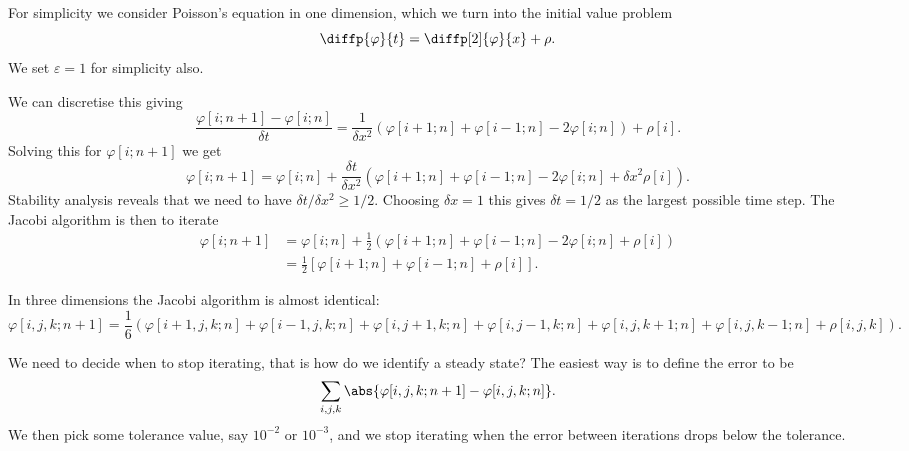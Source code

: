 \documentclass[fleqn]{NotesClass}
\begin{document}
    For simplicity we consider Poisson's equation in one dimension, which we turn into the initial value problem
    \begin{equation}
        \diffp{\varphi}{t} = \diffp[2]{\varphi}{x} + \rho.
    \end{equation}
    We set \(\varepsilon = 1\) for simplicity also.
    
    We can discretise this giving
    \begin{equation}
        \frac{\varphi[i; n + 1] - \varphi[i; n]}{\delta t} = \frac{1}{\delta x^2}(\varphi[i + 1; n] + \varphi[i - 1; n] - 2\varphi[i; n]) + \rho[i].
    \end{equation}
    Solving this for \(\varphi[i; n + 1]\) we get
    \begin{equation}
        \varphi[i; n + 1] = \varphi[i; n] + \frac{\delta t}{\delta x^2}(\varphi[i + 1; n] + \varphi[i - 1; n] - 2\varphi[i; n] + \delta x^2\rho[i]).
    \end{equation}
    Stability analysis reveals that we need to have \(\delta t/\delta x^2 \ge 1/2\).
    Choosing \(\delta x = 1\) this gives \(\delta t = 1/2\) as the largest possible time step.
    The Jacobi algorithm is then to iterate
    \begin{align}
        \varphi[i; n + 1] &= \varphi[i; n] + \frac{1}{2}(\varphi[i + 1; n] + \varphi[i - 1; n] - 2\varphi[i; n] + \rho[i])\\
        &= \frac{1}{2}[\varphi[i + 1; n] + \varphi[i - 1; n] + \rho[i]].
    \end{align}
    
    In three dimensions the Jacobi algorithm is almost identical:
    \begin{equation}
        \varphi[i, j, k; n + 1] = \frac{1}{6}(\varphi[i + 1, j, k; n] + \varphi[i - 1, j, k; n] + \varphi[i, j + 1, k; n] + \varphi[i, j - 1, k; n] + \varphi[i, j, k + 1; n] + \varphi[i, j, k - 1; n] + \rho[i, j, k]).
    \end{equation}
    
    We need to decide when to stop iterating, that is how do we identify a steady state?
    The easiest way is to define the error to be
    \begin{equation}
        \sum_{i, j, k} \abs{\varphi[i, j, k; n + 1] - \varphi[i, j, k; n]}.
    \end{equation}
    We then pick some tolerance value, say \(10^{-2}\) or \(10^{-3}\), and we stop iterating when the error between iterations drops below the tolerance.
    
\end{document}
